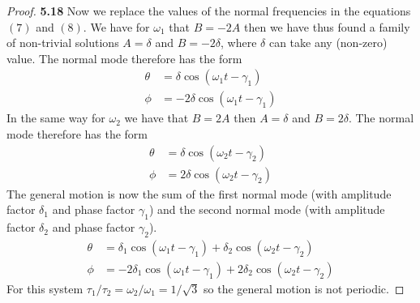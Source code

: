 \documentclass[11pt]{article}
\theoremstyle{definition}
\begin{document}
\begin{proof}{\textbf{5.18}}
        Now we replace the values of the normal frequencies in the equations
        $(7)$ and $(8)$. We have for $\omega_1$ that $B=-2A$ then we have thus
        found a family of non-trivial solutions $A=\delta$ and $B=-2\delta$,
        where $\delta$ can take any (non-zero) value. The normal mode therefore
        has the form
        \begin{align*}
            \theta &= \delta\cos(\omega_1 t - \gamma_1)\\
            \phi &= -2\delta\cos(\omega_1 t - \gamma_1)
        \end{align*}
        In the same way for $\omega_2$ we have that $B = 2A$ then $A=\delta$
        and $B = 2\delta$. The normal mode therefore has the form
        \begin{align*}
            \theta &= \delta\cos(\omega_2 t - \gamma_2)\\
            \phi &= 2\delta\cos(\omega_2 t - \gamma_2)
        \end{align*}
        The general motion is now the sum of the ﬁrst normal mode (with
        amplitude factor $\delta_1$ and phase factor $\gamma_1$) and the second
        normal mode (with amplitude factor $\delta_2$ and phase factor
        $\gamma_2$).
        \begin{align*}
            \theta &= \delta_1\cos(\omega_1 t - \gamma_1) + \delta_2\cos(\omega_2 t - \gamma_2)\\
            \phi &= -2\delta_1\cos(\omega_1 t - \gamma_1) + 2\delta_2\cos(\omega_2 t - \gamma_2)
        \end{align*}
        For this system $\tau_1/\tau_2 = \omega_2/\omega_1 = 1/\sqrt{3}$ so
        the general motion is not periodic.
    \end{proof}
\end{document}
